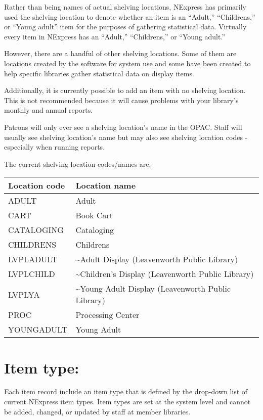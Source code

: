 \documentclass[letterpaper,10pt,english]{sphinxmanual}
\begin{document}
Rather than being names of actual shelving locations, NExpress has
primarily used the shelving location to denote whether an item is an
“Adult,” “Childrens,” or “Young adult” item for the purposes of
gathering statistical data. Virtually every item in NExpress has an
“Adult,” “Childrens,” or “Young adult.”

However, there are a handful of other shelving locations. Some of them
are locations created by the software for system use and some have been
created to help specific libraries gather statistical data on display
items.

Additionally, it is currently possible to add an item with no shelving
location. This is not recommended because it will cause problems with
your library’s monthly and annual reports.

Patrons will only ever see a shelving location’s name in the OPAC. Staff
will usually see shelving location’s name but may also see shelving
location codes - especially when running reports.

The current shelving location codes/names are:


\begin{savenotes}\sphinxattablestart
\centering
\begin{tabulary}{\linewidth}[t]{|T|T|}
\hline
\sphinxstyletheadfamily 
Location code
&\sphinxstyletheadfamily 
Location name
\\
\hline
ADULT
&
Adult
\\
\hline
CART
&
Book Cart
\\
\hline
CATALOGING
&
Cataloging
\\
\hline
CHILDRENS
&
Childrens
\\
\hline
LVPLADULT
&
\textasciitilde{}Adult Display (Leavenworth Public Library)
\\
\hline
LVPLCHILD
&
\textasciitilde{}Children’s Display (Leavenworth Public Library)
\\
\hline
LVPLYA
&
\textasciitilde{}Young Adult Display (Leavenworth Public Library)
\\
\hline
PROC
&
Processing Center
\\
\hline
YOUNGADULT
&
Young Adult
\\
\hline
\end{tabulary}
\par
\sphinxattableend\end{savenotes}


\section{Item type:}
\label{\detokenize{classification:item-type}}
Each item record  include an item type that is defined by the
drop-down list of current NExpress item types. Item types are set at the
system level and cannot be added, changed, or updated by staff at member
libraries.
\end{document}
